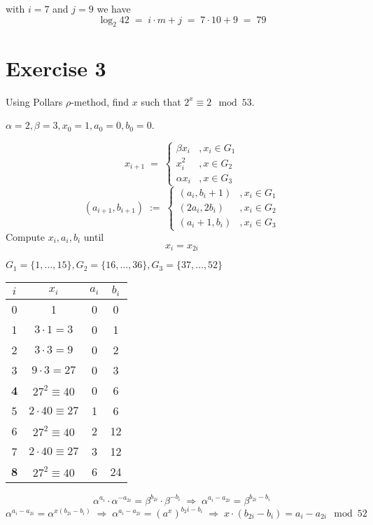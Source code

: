 \documentclass[a4paper]{scrreprt}
\begin{document}
with $i=7$ and $j=9$ we have
\[\log_2 42\;=\;i\cdot m+j\;=\;7\cdot 10+9\;=\;79\]

\section*{Exercise 3}

Using Pollars $\rho$-method, find $x$ such that $2^x\equiv 2\mod 53$.

$\alpha=2, \beta=3, x_0=1, a_0=0, b_0=0$.

\[x_{i+1} \;=\; \left\{\begin{array}{ll}
        \beta x_i & ,x_i\in G_1\\
        x_i^2 & ,x\in G_2\\
        \alpha x_i & ,x\in G_3
    \end{array}\right.\]
\[(a_{i+1}, b_{i+1}) \;:=\;\left\{\begin{array}{ll}
        (a_i, b_i+1) & ,x_i\in G_1\\
        (2a_i, 2b_i) & ,x_i\in G_2\\
        (a_i+1, b_i) & ,x_i\in G_3
    \end{array}\right.\]
Compute $x_i, a_i, b_i$ until \[x_i=x_{2i}\]

$G_1=\{1,\hdots,15\}, G_2=\{16,\hdots,36\}, G_3=\{37,\hdots,52\}$

\begin{center}
    \begin{tabular}{cccc}
        $i$ & $x_i$ & $a_i$ & $b_i$ \\
        \hline
        0 & 1 & 0 & 0 \\
        1 & $3\cdot 1=3$ & 0 & 1\\
        2 & $3\cdot 3=9$ & 0 & 2\\
        3 & $9\cdot 3=27$ & 0 & 3\\
        \textbf4 & $27^2\equiv 40$ & 0 & 6\\
        5 & $2\cdot40\equiv27$ & 1 & 6\\
        6 & $27^2\equiv40$ & 2 & 12\\
        7 & $2\cdot40\equiv27$ & 3 & 12\\
        \textbf8 & $27^2\equiv40$ & 6 & 24\\
    \end{tabular}
\end{center}

\[\alpha^{a_i}\cdot\alpha^{-a_{2i}} = \beta^{b_{2i}}\cdot\beta^{-b_i}
    \;\Rightarrow\; \alpha^{a_i-a_{2i}} = \beta^{b_{2i}-b_i}\]
    \[\alpha^{a_i-a_{2i}} = \alpha^{x(b_{2i}-b_i)}
    \;\Rightarrow\; \alpha^{a_i-a_{2i}}=(a^x)^{b_2i-b_i} \;\Rightarrow\;
x\cdot(b_{2i}-b_i)=a_i-a_{2i}\mod 52\]
\end{document}

